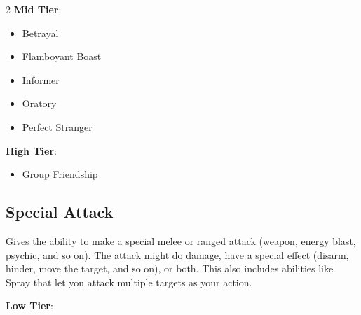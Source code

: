 \begin{multicols}{2}
\textbf{Mid Tier}:

\begin{itemize}
\item Betrayal
\item Flamboyant Boast
\item Informer
\item Oratory
\item Perfect Stranger
\end{itemize}

\textbf{High Tier}:

\begin{itemize}
\item Group Friendship
\end{itemize}

\subsection{Special Attack}

Gives the ability to make a special melee or ranged attack (weapon, energy blast, psychic, and so on). The attack might do damage, have a special effect (disarm, hinder, move the target, and so on), or both. This also includes abilities like Spray that let you attack multiple targets as your action.

\textbf{Low Tier}:


\end{multicols}
